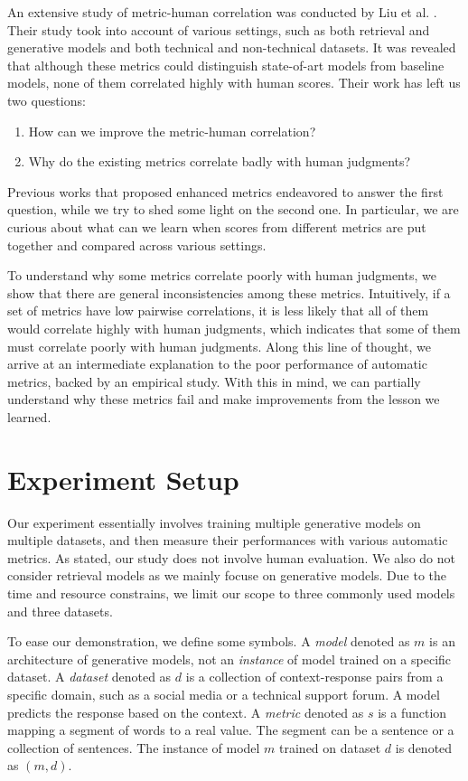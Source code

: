 \documentclass[runningheads]{llncs}
\begin{document}
    An extensive study of metric-human correlation was conducted by Liu et al. \cite{HowNot}. Their study took into account of various settings, such as both retrieval and generative models and both technical and non-technical datasets. It was revealed that although these metrics could distinguish state-of-art models from baseline models, none of them correlated highly with human scores. Their work has left us two questions:
    \begin{enumerate}
        \item How can we improve the metric-human correlation?
        \item Why do the existing metrics correlate badly with human judgments?
    \end{enumerate}
    Previous works that proposed enhanced metrics endeavored to answer the first question, while we try to shed some light on the second one. In particular, we are curious about what can we learn when scores from different metrics are put together and compared across various settings.

    To understand why some metrics correlate poorly with human judgments, we show that there are general inconsistencies among these metrics. Intuitively, if a set of metrics have low pairwise correlations, it is less likely that all of them would correlate highly with human judgments, which indicates that some of them must correlate poorly with human judgments. Along this line of thought, we arrive at an intermediate explanation to the poor performance of automatic metrics, backed by an empirical study. With this in mind, we can partially understand why these metrics fail and make improvements from the lesson we learned.

    \section{Experiment Setup}
    Our experiment essentially involves training multiple generative models on multiple datasets, and then measure their performances with various automatic metrics. As stated, our study does not involve human evaluation. We also do not consider retrieval models as we mainly focuse on generative models. Due to the time and resource constrains, we limit our scope to three commonly used models and three datasets.

    To ease our demonstration, we define some symbols. A \emph{model} denoted as $m$ is an architecture of generative models, not an \emph{instance} of model trained on a specific dataset. A \emph{dataset} denoted as $d$ is a collection of context-response pairs from a specific domain, such as a social media or a technical support forum. A model predicts the response based on the context. A \emph{metric} denoted as $s$ is a function mapping a segment of words to a real value. The segment can be a sentence or a collection of sentences. The instance of model $m$ trained on dataset $d$ is denoted as $(m, d)$.
\end{document}
